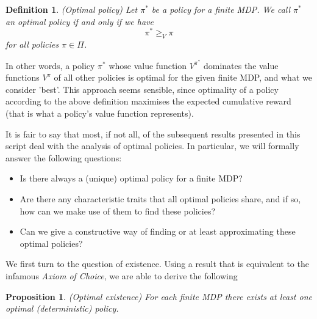 \documentclass[11pt]{article} %
\newtheorem{prop}{Proposition}
\newtheorem{defn}{Definition}
\begin{document}
\begin{defn}{(Optimal policy)}
	Let $\pi^*$ be a policy for a finite MDP. We call $\pi^*$ an \textit{optimal policy} if and only if we have $$\pi^* \ge_{V} \pi$$ for all policies $\pi \in \Pi$.
\end{defn}

In other words, a policy $\pi^*$ whose value function $V^{\pi^*}$ dominates the value functions $V^{\pi}$ of all other policies is optimal for the given finite MDP, and what we consider 'best'. This approach seems sensible, since optimality of a policy according to the above definition maximises the expected cumulative reward (that is what a policy's value function represents).

It is fair to say that most, if not all, of the subsequent results presented in this script deal with the analysis of optimal policies. In particular, we will formally answer the following questions:

\begin{itemize}
	\item Is there always a (unique) optimal policy for a finite MDP?
	\item Are there any characteristic traits that all optimal policies share, and if so, how can we make use of them to find these policies?
	\item Can we give a constructive way of finding or at least approximating these optimal policies?
\end{itemize}

We first turn to the question of existence. Using a result that is equivalent to the infamous \textit{Axiom of Choice}, we are able to derive the following 

\begin{prop}{(Optimal existence)}
	For each finite MDP there exists at least one optimal (deterministic) policy.
\end{prop}
\end{document}
